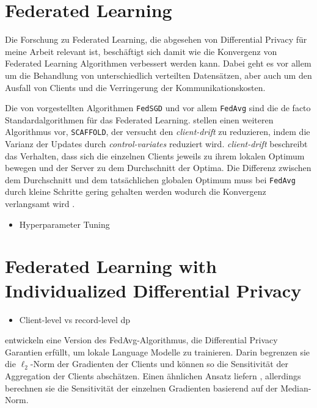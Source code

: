 \section{Federated Learning}\label{sec:rw-fl}

Die Forschung zu Federated Learning, die abgesehen von Differential Privacy für meine Arbeit relevant ist, beschäftigt sich damit wie die Konvergenz von Federated Learning Algorithmen verbessert werden kann. Dabei geht es vor allem um die Behandlung von unterschiedlich verteilten Datensätzen, aber auch um den Ausfall von Clients und die Verringerung der Kommunikationskosten.

Die von \textcite{mcmahan:2016} vorgestellten Algorithmen \texttt{FedSGD} und vor allem \texttt{FedAvg} sind die de facto Standardalgorithmen für das Federated Learning. \textcite{karimireddy:2020} stellen einen weiteren Algorithmus vor, \texttt{SCAFFOLD}, der versucht den \textit{client-drift} zu reduzieren, indem die Varianz der Updates durch \textit{control-variates} reduziert wird. \textit{client-drift} beschreibt das Verhalten, dass sich die einzelnen Clients jeweils zu ihrem lokalen Optimum bewegen und der Server zu dem Durchschnitt der Optima. Die Differenz zwischen dem Durchschnitt und dem tatsächlichen globalen Optimum muss bei \texttt{FedAvg} durch kleine Schritte gering gehalten werden wodurch die Konvergenz verlangsamt wird \parencite[p.4]{karimireddy:2020}.

\begin{itemize}
	\item Hyperparameter Tuning
\end{itemize}

\section{Federated Learning with Individualized Differential Privacy}\label{sec:rw-flidp}

\begin{itemize}
	\item Client-level vs record-level dp
\end{itemize}

\textcite{mcmahan:2018} entwickeln eine Version des FedAvg-Algorithmus, die Differential Privacy Garantien erfüllt, um lokale Language Modelle zu trainieren. Darin begrenzen sie die $\ell_2$-Norm der Gradienten der Clients und können so die Sensitivität der Aggregation der Clients abschätzen. Einen ähnlichen Ansatz liefern \textcite{geyer:2017}, allerdings berechnen sie die Sensitivität der einzelnen Gradienten basierend auf der Median-Norm.

